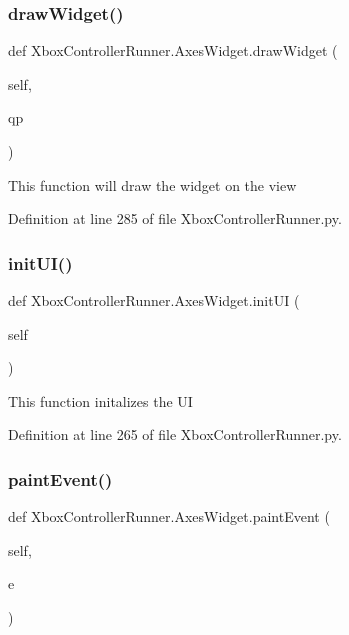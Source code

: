 \subsubsection{\texorpdfstring{draw\+Widget()}{drawWidget()}}
{\footnotesize\ttfamily def Xbox\+Controller\+Runner.\+Axes\+Widget.\+draw\+Widget (\begin{DoxyParamCaption}\item[{}]{self,  }\item[{}]{qp }\end{DoxyParamCaption})}

\begin{DoxyVerb}This function will draw the widget on the view\end{DoxyVerb}
 

Definition at line 285 of file Xbox\+Controller\+Runner.\+py.

\mbox{\label{class_xbox_controller_runner_1_1_axes_widget_ab5824aeff9ffdd5f4280a576c26ff72a}} 
\subsubsection{\texorpdfstring{init\+U\+I()}{initUI()}}
{\footnotesize\ttfamily def Xbox\+Controller\+Runner.\+Axes\+Widget.\+init\+UI (\begin{DoxyParamCaption}\item[{}]{self }\end{DoxyParamCaption})}

\begin{DoxyVerb}This function initalizes the UI\end{DoxyVerb}
 

Definition at line 265 of file Xbox\+Controller\+Runner.\+py.

\mbox{\label{class_xbox_controller_runner_1_1_axes_widget_a9689ba86692377eb219bb3f0fa5ad2e8}} 
\subsubsection{\texorpdfstring{paint\+Event()}{paintEvent()}}
{\footnotesize\ttfamily def Xbox\+Controller\+Runner.\+Axes\+Widget.\+paint\+Event (\begin{DoxyParamCaption}\item[{}]{self,  }\item[{}]{e }\end{DoxyParamCaption})}

